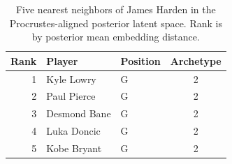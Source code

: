 \begin{table}[htbp]
  \centering\small
  \begin{tabular}{rllc}
    \toprule
    Rank & Player & Position & Archetype \\
    \midrule
    1 & Kyle Lowry & G & 2 \\
    2 & Paul Pierce & G & 2 \\
    3 & Desmond Bane & G & 2 \\
    4 & Luka Doncic & G & 2 \\
    5 & Kobe Bryant & G & 2 \\
    \bottomrule
  \end{tabular}
  \caption{Five nearest neighbors of James Harden in the Procrustes-aligned posterior latent space. Rank is by posterior mean embedding distance.}
  \label{tab:James_Harden_neighbors}
\end{table}

